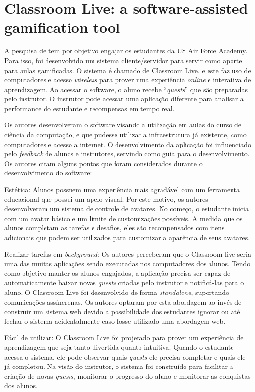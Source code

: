 \documentclass[
	12pt,				%
	oneside,			%
	a4paper,			%
	english,			%
	french,				%
	spanish,			%
	brazil,				%
	]{abntex2}
\begin{document}
\section{Classroom Live: a software-assisted gamification tool}
\label{sec:classrom}

A pesquisa de \citet{de2013classroom} tem por objetivo engajar os estudantes da US Air Force Academy. Para isso, foi desenvolvido um sistema cliente/servidor para servir como aporte para aulas gamificadas. O sistema é chamado de Classroom Live, e este faz uso de computadores e acesso \textit{wireless} para prover uma experiência \textit{online} e interativa de aprendizagem. Ao acessar o software, o aluno recebe “\textit{quests}” que são preparadas pelo instrutor. O instrutor pode acessar uma aplicação diferente para analisar a performance do estudante e recompensas em tempo real.

Os autores desenvolveram o software visando a utilização em aulas do curso de ciência da computação, e que pudesse utilizar a infraestrutura já existente, como computadores e acesso a internet. O desenvolvimento da aplicação foi influenciado pelo \textit{feedback} de alunos e instrutores, servindo como guia para o desenvolvimento. Os autores citam alguns pontos que foram considerados durante o desenvolvimento do software:

Estética: Alunos possuem uma experiência mais agradável com um ferramenta educacional que possui um apelo visual. Por este motivo, os autores desenvolveram um sistema de controle de avatares. No começo, o estudante inicia com um avatar básico e um limite de customizações possíveis. A medida que os alunos completam as tarefas e desafios, eles são recompensados com itens adicionais que podem ser utilizados para customizar a aparência de seus avatares.

Realizar tarefas em \textit{background}: Os autores perceberam que o Classroom live seria uma das muitas aplicações sendo executadas nos computadores dos alunos. Tendo como objetivo manter os alunos engajados, a aplicação precisa ser capaz de automaticamente baixar novas \textit{quests} criadas pelo instrutor e notificá-las para o aluno. O Classroom Live foi desenvolvido de forma \textit{standalone}, suportando comunicações assíncronas. Os autores optaram por esta abordagem ao invés de construir um sistema web devido a possibilidade dos estudantes ignorar ou até fechar o sistema acidentalmente caso fosse utilizado uma abordagem web.

Fácil de utilizar: O Classroom Live foi projetado para prover um experiência de aprendizagem que seja tanto divertida quanto intuitiva. Quando o estudante acessa o sistema, ele pode observar quais \textit{quests} ele precisa completar e quais ele já completou. Na visão do instrutor, o sistema foi construído para facilitar a criação de novas \textit{quests}, monitorar o progresso do aluno e monitorar as conquistas dos alunos.
\end{document}

